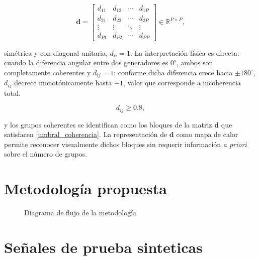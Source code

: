 \begin{equation}
\mathbf{d} =
\begin{bmatrix}
d_{11} & d_{12} & \cdots & d_{1P} \\
d_{21} & d_{22} & \cdots & d_{2P} \\
\vdots & \vdots & \ddots & \vdots \\
d_{P1} & d_{P2} & \cdots & d_{PP}
\end{bmatrix} \in \mathbb{R}^{P \times P},
\label{eq:matriz_cosenos}
\end{equation}

simétrica y con diagonal unitaria, $d_{ii} = 1$. La interpretación física es directa: cuando 
la diferencia angular entre dos generadores es $0^{\circ}$, ambos son completamente coherentes 
y $d_{ij} = 1$; conforme dicha diferencia crece hacia $\pm 180^{\circ}$, $d_{ij}$ decrece
 monotónicamente hasta $-1$, valor que corresponde a incoherencia total.

\begin{equation}
d_{ij} \geq 0.8,
\label{umbral_coherencia}
\end{equation}

y los grupos coherentes se identifican como los bloques de la matriz $\mathbf{d}$ que 
satisfacen \eqref{umbral_coherencia}. La representación de $\mathbf{d}$ como mapa de 
calor permite reconocer visualmente dichos bloques sin requerir información \textit{a priori} 
sobre el número de grupos.


\section{Metodología propuesta}

  \begin{figure}[H]
     \centering
     
     \caption{Diagrama de flujo de la metodología}
     \label{fig:metodologia}
 \end{figure}




\section{Señales de prueba sinteticas}



